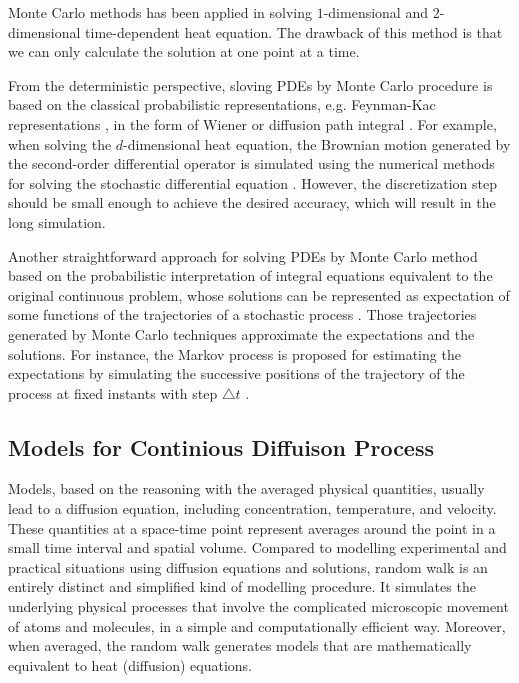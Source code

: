 Monte Carlo methods has been applied in solving $1$-dimensional and
$2$-dimensional time-dependent heat equation. The drawback of this
method is that we can only calculate the solution at one point at a
time. 

From the deterministic perspective, sloving PDEs by Monte Carlo
procedure is based on the classical probabilistic representations,
e.g. Feynman-Kac representations \cite{kac1987enigmas}, in the form of
Wiener or diffusion path integral \cite{sabelfeld2013random}. For
example, when solving the $d$-dimensional heat equation, the Brownian
motion generated by the second-order differential operator is
simulated using the numerical methods for solving the stochastic
differential equation \cite{wiki:MCMheat}. However, the discretization
step should be small enough to achieve the desired accuracy, which
will result in the long simulation.

Another straightforward approach for solving PDEs by Monte Carlo
method based on the probabilistic interpretation of integral equations
equivalent to the original continuous problem, whose solutions can be
represented as expectation of some functions of the trajectories of a
stochastic process
\cite{varadhan1980lectures}\cite{grebenkov2014efficient}\cite{sabelfeld2013random}.
Those trajectories generated by Monte Carlo techniques approximate the
expectations and the solutions. For instance, the Markov process is
proposed for estimating the expectations by simulating the successive
positions of the trajectory of the process at fixed instants with step
$\triangle t$ \cite{kronberg1976solution}\cite{king1951monte}.



\subsection{Models for Continious Diffuison Process}

Models, based on the reasoning with the averaged physical quantities,
usually lead to a diffusion equation, including concentration,
temperature, and velocity. These quantities at a space-time point
represent averages around the point in a small time interval and
spatial volume. Compared to modelling experimental and practical
situations using diffusion equations and solutions, random walk is
an entirely distinct and simplified kind of modelling procedure. It
simulates the underlying physical processes that involve the
complicated microscopic movement of atoms and molecules, in a simple
and computationally efficient way. Moreover, when averaged, the random
walk generates models that are mathematically equivalent to heat
(diffusion) equations.

